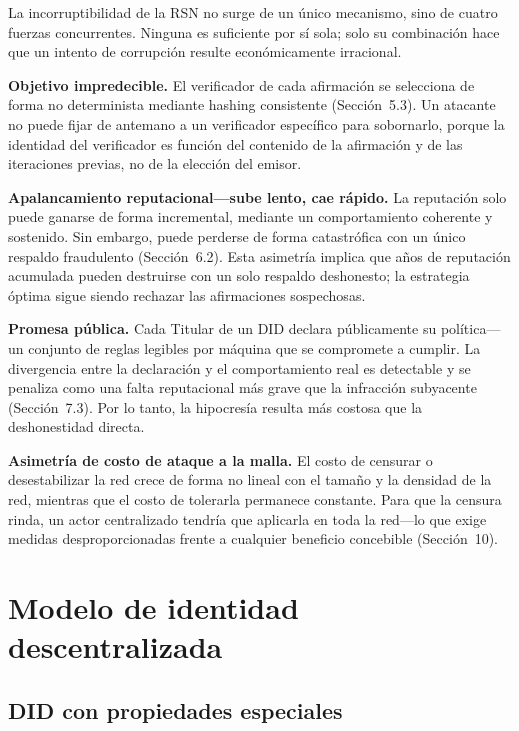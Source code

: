 \documentclass[11pt,a4paper,twocolumn]{article}
\begin{document}
La incorruptibilidad de la RSN no surge de un único mecanismo, sino de cuatro fuerzas concurrentes. Ninguna es suficiente por sí sola; solo su combinación hace que un intento de corrupción resulte económicamente irracional.

\textbf{Objetivo impredecible.} El verificador de cada afirmación se selecciona de forma no determinista mediante hashing consistente (Sección~5.3). Un atacante no puede fijar de antemano a un verificador específico para sobornarlo, porque la identidad del verificador es función del contenido de la afirmación y de las iteraciones previas, no de la elección del emisor.

\textbf{Apalancamiento reputacional---sube lento, cae rápido.} La reputación solo puede ganarse de forma incremental, mediante un comportamiento coherente y sostenido. Sin embargo, puede perderse de forma catastrófica con un único respaldo fraudulento (Sección~6.2). Esta asimetría implica que años de reputación acumulada pueden destruirse con un solo respaldo deshonesto; la estrategia óptima sigue siendo rechazar las afirmaciones sospechosas.

\textbf{Promesa pública.} Cada Titular de un DID declara públicamente su política---un conjunto de reglas legibles por máquina que se compromete a cumplir. La divergencia entre la declaración y el comportamiento real es detectable y se penaliza como una falta reputacional más grave que la infracción subyacente (Sección~7.3). Por lo tanto, la hipocresía resulta más costosa que la deshonestidad directa.

\textbf{Asimetría de costo de ataque a la malla.} El costo de censurar o desestabilizar la red crece de forma no lineal con el tamaño y la densidad de la red, mientras que el costo de tolerarla permanece constante. Para que la censura rinda, un actor centralizado tendría que aplicarla en toda la red---lo que exige medidas desproporcionadas frente a cualquier beneficio concebible (Sección~10).

\section{Modelo de identidad descentralizada}

\subsection{DID con propiedades especiales}
\end{document}
